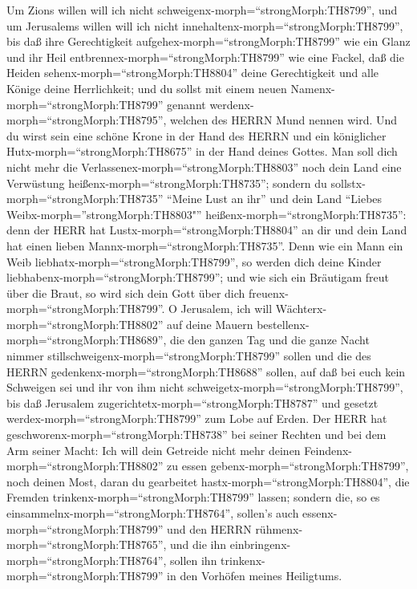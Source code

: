  Um Zions willen will ich nicht
schweigenx-morph=``strongMorph:TH8799'', und um Jerusalems willen will
ich nicht innehaltenx-morph=``strongMorph:TH8799'', bis daß ihre
Gerechtigkeit aufgehex-morph=``strongMorph:TH8799'' wie ein Glanz und
ihr Heil entbrennex-morph=``strongMorph:TH8799'' wie eine Fackel,
 daß die Heiden sehenx-morph=``strongMorph:TH8804'' deine
Gerechtigkeit und alle Könige deine Herrlichkeit; und du sollst mit
einem neuen Namenx-morph=``strongMorph:TH8799'' genannt
werdenx-morph=``strongMorph:TH8795'', welchen des HERRN Mund nennen
wird.  Und du wirst sein eine schöne Krone in der Hand des
HERRN und ein königlicher Hutx-morph=``strongMorph:TH8675'' in der Hand
deines Gottes.  Man soll dich nicht mehr die
Verlassenex-morph=``strongMorph:TH8803'' noch dein Land eine Verwüstung
heißenx-morph=``strongMorph:TH8735''; sondern du
sollstx-morph=``strongMorph:TH8735'' ``Meine Lust an ihr'' und dein Land
``Liebes Weibx-morph=''strongMorph:TH8803"''
heißenx-morph=``strongMorph:TH8735'': denn der HERR hat
Lustx-morph=``strongMorph:TH8804'' an dir und dein Land hat einen lieben
Mannx-morph=``strongMorph:TH8735''.  Denn wie ein Mann ein
Weib liebhatx-morph=``strongMorph:TH8799'', so werden dich deine Kinder
liebhabenx-morph=``strongMorph:TH8799''; und wie sich ein Bräutigam
freut über die Braut, so wird sich dein Gott über dich
freuenx-morph=``strongMorph:TH8799''.  O Jerusalem, ich will
Wächterx-morph=``strongMorph:TH8802'' auf deine Mauern
bestellenx-morph=``strongMorph:TH8689'', die den ganzen Tag und die
ganze Nacht nimmer stillschweigenx-morph=``strongMorph:TH8799'' sollen
und die des HERRN gedenkenx-morph=``strongMorph:TH8688'' sollen, auf daß
bei euch kein Schweigen sei  und ihr von ihm nicht
schweigetx-morph=``strongMorph:TH8799'', bis daß Jerusalem
zugerichtetx-morph=``strongMorph:TH8787'' und gesetzt
werdex-morph=``strongMorph:TH8799'' zum Lobe auf Erden.  Der
HERR hat geschworenx-morph=``strongMorph:TH8738'' bei seiner Rechten und
bei dem Arm seiner Macht: Ich will dein Getreide nicht mehr deinen
Feindenx-morph=``strongMorph:TH8802'' zu essen
gebenx-morph=``strongMorph:TH8799'', noch deinen Most, daran du
gearbeitet hastx-morph=``strongMorph:TH8804'', die Fremden
trinkenx-morph=``strongMorph:TH8799'' lassen;  sondern die,
so es einsammelnx-morph=``strongMorph:TH8764'', sollen's auch
essenx-morph=``strongMorph:TH8799'' und den HERRN
rühmenx-morph=``strongMorph:TH8765'', und die ihn
einbringenx-morph=``strongMorph:TH8764'', sollen ihn
trinkenx-morph=``strongMorph:TH8799'' in den Vorhöfen meines Heiligtums.
